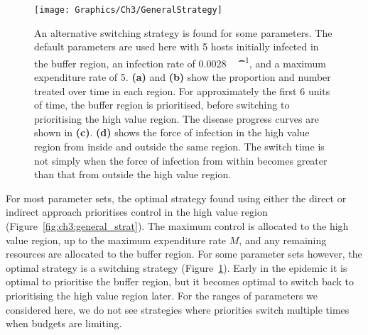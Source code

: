 \begin{figure}
    \begin{center}
        \texttt{[image: Graphics/Ch3/GeneralStrategy]}
        \caption[General optimal strategy]{The general strategy that is found in the majority of cases prioritises control in the high value region. Here the default parameters are used, with 5 hosts initially infected in the buffer region and an infection rate of \SI{0.005}{\per\host\per\t}. \textbf{(a)} shows the proportion of hosts being treated in each region over time, with the number of hosts being treated shown in \textbf{(b)}. The strategy allocates as many resources as possible to the high value region, before spending the remainder in the buffer region. After around 3 time units the number of infected hosts in the high value region exceeds the maximum expenditure $M$, and not all can be treated. \textbf{(c)} shows the disease progress curve for each region.\label{fig:ch3:general_strat}}
        \vspace*{\floatsep}
        \caption[Switching optimal strategy]{An alternative switching strategy is found for some parameters. The default parameters are used here with 5 hosts initially infected in the buffer region, an infection rate of \SI{0.0028}{\per\host\per\t}, and a maximum expenditure rate of \SI{5}{\hosts}. \textbf{(a)} and \textbf{(b)} show the proportion and number treated over time in each region. For approximately the first 6 units of time, the buffer region is prioritised, before switching to prioritising the high value region. The disease progress curves are shown in \textbf{(c)}. \textbf{(d)} shows the force of infection in the high value region from inside and outside the same region. The switch time is not simply when the force of infection from within becomes greater than that from outside the high value region.\label{fig:ch3:switch_strat}}
    \end{center}
\end{figure}

For most parameter sets, the optimal strategy found using either the direct or indirect approach prioritises control in the high value region (Figure~\ref{fig:ch3:general_strat}). The maximum control is allocated to the high value region, up to the maximum expenditure rate $M$, and any remaining resources are allocated to the buffer region. For some parameter sets however, the optimal strategy is a switching strategy (Figure~\ref{fig:ch3:switch_strat}). Early in the epidemic it is optimal to prioritise the buffer region, but it becomes optimal to switch back to prioritising the high value region later. For the ranges of parameters we considered here, we do not see strategies where priorities switch multiple times when budgets are limiting.

